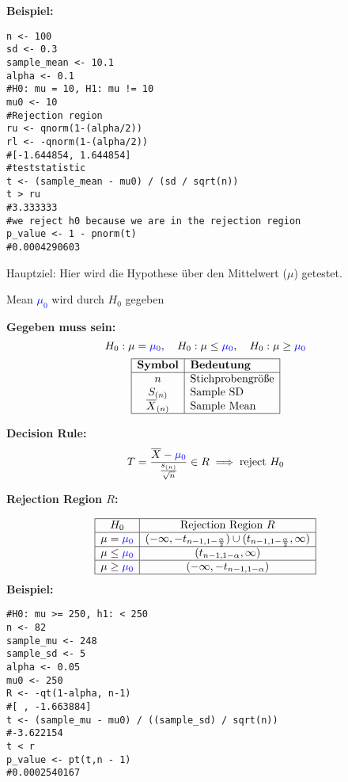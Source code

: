 \large{\textbf{Beispiel:}}
\begin{lstlisting}
n <- 100
sd <- 0.3
sample_mean <- 10.1
alpha <- 0.1
#H0: mu = 10, H1: mu != 10
mu0 <- 10
#Rejection region
ru <- qnorm(1-(alpha/2))
rl <- -qnorm(1-(alpha/2))
#[-1.644854, 1.644854]
#teststatistic
t <- (sample_mean - mu0) / (sd / sqrt(n))
t > ru
#3.333333
#we reject h0 because we are in the rejection region
p_value <- 1 - pnorm(t)
#0.0004290603
\end{lstlisting}
\columnbreak
\begin{center}
\end{center}
\normalsize
Hauptziel: Hier wird die Hypothese über den Mittelwert ($\mu$) getestet.
\begin{center}

\textcolor{red}{\warning} Mean \textcolor{blue}{$\mu_0$} wird durch $H_0$ gegeben \textcolor{red}{\warning}
\end{center}
\large{\textbf{Gegeben muss sein:}}
\[
H_0: \mu = \textcolor{blue}{\mu_0}, \quad H_0: \mu \leq \textcolor{blue}{\mu_0}, \quad H_0: \mu \geq \textcolor{blue}{\mu_0}
\]
\[
\begin{array}{|c|l|}
\hline
\textbf{Symbol} & \textbf{Bedeutung} \\
\hline
n & \text{Stichprobengröße} \\
S_{(n)} & \text{Sample SD} \\
\overline{X}_{(n)} & \text{Sample Mean} \\
\hline
\end{array}
\]

\begin{comment}
\large{\textbf{Teststatistik:}}

\[
T = \frac{\overline{X}_{(n)} - \textcolor{blue}{\mu}}{\frac{s_{(n)}}{\sqrt{n}}} \sim t_{n-1},\text{with }
s^2_{(n)} = \frac{1}{n-1} \sum_{i=1}^n (X_i - \overline{X}_{(n)})^2
\]
\end{comment}
\large{\textbf{Decision Rule:}}
\[
T = \frac{\overline{X} - \textcolor{blue}{\mu_0}}{\frac{s_{(n)}}{\sqrt{n}}} \in R \implies \text{reject } H_0
\]

\large{\textbf{Rejection Region \(R\):}}

\[
\begin{array}{|c|c|}
\hline
H_0 & \text{Rejection Region } R \\ \hline
\mu = \textcolor{blue}{\mu_0} & (-\infty, -t_{n-1, 1-\frac{\alpha}{2}}) \cup (t_{n-1, 1-\frac{\alpha}{2}}, \infty) \\ \hline
\mu \leq \textcolor{blue}{\mu_0} & (t_{n-1, 1-\alpha}, \infty) \\ \hline
\mu \geq \textcolor{blue}{\mu_0} & (-\infty, -t_{n-1, 1-\alpha}) \\ \hline
\end{array}
\]
\large{\textbf{Beispiel:}}
\begin{lstlisting}
#H0: mu >= 250, h1: < 250
n <- 82
sample_mu <- 248
sample_sd <- 5
alpha <- 0.05
mu0 <- 250
R <- -qt(1-alpha, n-1)
#[ , -1.663884]
t <- (sample_mu - mu0) / ((sample_sd) / sqrt(n))
#-3.622154
t < r
p_value <- pt(t,n - 1)
#0.0002540167
\end{lstlisting}
\columnbreak